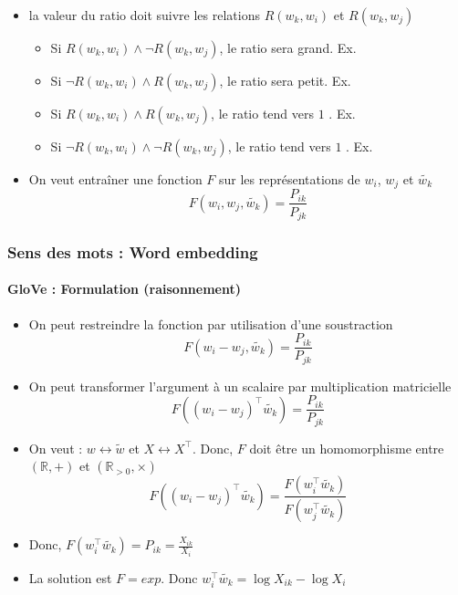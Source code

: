 \documentclass[xcolor=table]{beamer}
\begin{document}
\begin{frame}
\begin{itemize}
	\item la valeur du ratio doit suivre les relations $R(w_k, w_i)$ et $R(w_k, w_j)$
	\begin{itemize}
		\item Si $R(w_k, w_i) \wedge \neg R(w_k, w_j)$, le ratio sera grand. Ex. 
		\item Si $\neg R(w_k, w_i) \wedge R(w_k, w_j)$, le ratio sera petit. Ex. 
		\item Si $R(w_k, w_i) \wedge R(w_k, w_j)$, le ratio tend vers $1$ . Ex. 
		\item Si $\neg R(w_k, w_i) \wedge \neg R(w_k, w_j)$, le ratio tend vers $1$ . Ex. 
	\end{itemize}
	\item On veut entraîner une fonction $F$ sur les représentations de $w_i$, $w_j$ et $\tilde{w_k}$
	\vspace{-6pt}\[F(w_i, w_j, \tilde{w_k}) = \frac{P_{ik}}{P_{jk}}\]
\end{itemize}
	
\end{frame}

\begin{frame}
\frametitle{Sens des mots : Word embedding}
\framesubtitle{GloVe : Formulation (raisonnement)}
	
\begin{itemize}
	\item On peut restreindre la fonction par utilisation d'une soustraction
	\vspace{-6pt}\[F(w_i - w_j, \tilde{w_k}) = \frac{P_{ik}}{P_{jk}}\]
	
	\item On peut transformer l'argument à un scalaire par multiplication matricielle
	\vspace{-6pt}\[F((w_i - w_j)^\top \tilde{w_k}) = \frac{P_{ik}}{P_{jk}}\]
	
	\item On veut : $w \leftrightarrow \tilde{w}$ et $X \leftrightarrow X^\top$. Donc, $F$ doit être un homomorphisme entre $(\mathbb{R}, +)$ et $(\mathbb{R}_{>0}, \times)$
	\vspace{-6pt}\[F((w_i - w_j)^\top \tilde{w_k}) = \frac{F(w_i^\top \tilde{w_k})}{F(w_j^\top \tilde{w_k})}\]
	
	\item Donc, $F(w_i^\top \tilde{w_k}) = P_{ik} = \frac{X_{ik}}{X_i}$
	
	\item La solution est $F = exp$. Donc $w_i^\top \tilde{w_k} = \log X_{ik} - \log X_i$
\end{itemize}
	
\end{frame}
\end{document}
